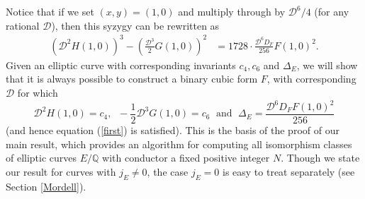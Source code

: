 Notice that if we set $(x,y)=(1,0)$ and multiply through by $\mathcal{D}^6/4$ (for any rational $\mathcal{D}$), then 
this syzygy can be rewritten as
\begin{align*}
  ( \mathcal{D}^2 H(1,0))^3 - \left( \frac{\mathcal{D}^3}{2} G(1,0) \right)^2 
  &=  1728 \cdot \frac{\mathcal{D}^6 D_F}{256} F(1,0)^2.
\end{align*}
Given an elliptic curve with corresponding invariants $c_4, c_6$ and $\Delta_E$, we will show that it is always possible to construct a binary 
cubic form $F$, with corresponding  $\mathcal{D}$ for which 
$$
\mathcal{D}^2 H(1,0) = c_4, \; \; -\frac{1}{2} \mathcal{D}^3 G(1,0) = c_6 \; \mbox{ and } \; \Delta_E =  \frac{\mathcal{D}^6  D_F F(1,0)^2}{256}
$$
(and hence equation (\ref{first}) is satisfied). This is the basis of the proof of our main result, which provides an algorithm for computing all isomorphism classes of elliptic curves $E/\mathbb{Q}$ with conductor a fixed positive integer $N$. Though we state our result for curves with $j_E \neq 0$, the case $j_E=0$ is easy to treat separately (see Section \ref{Mordell}). 

